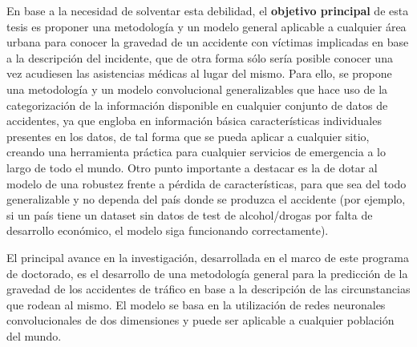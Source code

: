 \documentclass{uathesis-es}
\begin{document}
En base a la necesidad de solventar esta debilidad, el \textbf{objetivo principal} de esta tesis es proponer una metodología y un modelo general aplicable a cualquier área urbana para conocer la gravedad de un accidente con víctimas implicadas en base a la descripción del incidente, que de otra forma sólo sería posible conocer una vez acudiesen las asistencias médicas al lugar del mismo. Para ello, se propone una metodología y un modelo convolucional generalizables que hace uso de la categorización de la información disponible en cualquier conjunto de datos de accidentes, ya que engloba en información básica características individuales presentes en los datos, de tal forma que se pueda aplicar a cualquier sitio, creando una herramienta práctica para cualquier servicios de emergencia a lo largo de todo el mundo.
Otro punto importante a destacar es la de dotar al modelo de una robustez frente a pérdida de características, para que sea del todo generalizable y no dependa del país donde se produzca el accidente (por ejemplo, si un país tiene un dataset sin datos de test de alcohol/drogas por falta de desarrollo económico, el modelo siga funcionando correctamente).




El principal avance en la investigación, desarrollada en el marco de este programa de doctorado, es el desarrollo de una metodología general  para la predicción de la gravedad de los accidentes de tráfico en base a la descripción de las circunstancias que rodean al mismo. El modelo se basa en la utilización de redes neuronales convolucionales de dos dimensiones y puede ser aplicable a cualquier población del mundo.

\end{document}
